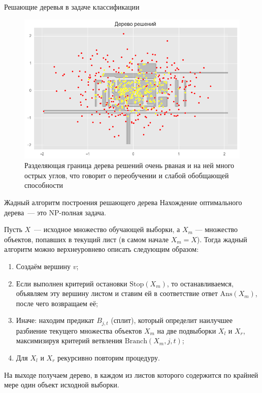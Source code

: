 \documentclass[notheorems, handout]{beamer}
\begin{document}
\begin{frame}{Решающие деревья в задаче классификации}
	\begin{figure}[h!]
		\includegraphics[width=0.9 \textwidth]{img/cltree2}
		\caption{Разделяющая граница дерева решений очень рваная и на ней много острых углов, что говорит о переобучении и слабой обобщающей способности}
	\end{figure}
\end{frame}

\begin{frame}{Жадный алгоритм построения решающего дерева}
	Нахождение оптимального дерева~--- это NP-полная задача.

	Пусть $X$~--- исходное множество обучающей выборки, а $X _m$ — множество объектов, попавших в текущий лист (в самом начале $X _m = X$). Тогда жадный алгоритм можно верхнеуровнево описать следующим образом:

	\begin{enumerate}
		\item Создаём вершину $v$;
		\item Если выполнен критерий остановки $\mathrm{Stop}(X _m)$, то останавливаемся, объявляем эту вершину листом и ставим ей в соответствие ответ $\mathrm{Ans}(X _m)$, после чего возвращаем её;
		\item Иначе: находим предикат $B _{j, t}$ (сплит), который определит наилучшее разбиение текущего множества объектов $X _m$ на две подвыборки $X _l$ и $X _r$, максимизируя критерий ветвления $\mathrm{Branch}(X _m, j, t)$;
		\item Для $X _l$ и $X _r$ рекурсивно повторим процедуру.
	\end{enumerate}

	На выходе получаем дерево, в каждом из листов которого содержится по крайней мере один объект исходной выборки. 
\end{frame}
\end{document}
